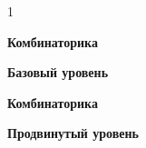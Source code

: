 1\hspace{3mm}

\centerline{\bf \Huge Комбинаторика}

\centerline{\bf \large Базовый уровень}

\begin{flushright}
        \scriptsize{}
\end{flushright}










\newpage

\hspace{3mm}

\centerline{\bf \Huge Комбинаторика}

\centerline{\bf \large Продвинутый уровень}

\begin{flushright}
        \scriptsize{}
\end{flushright}





